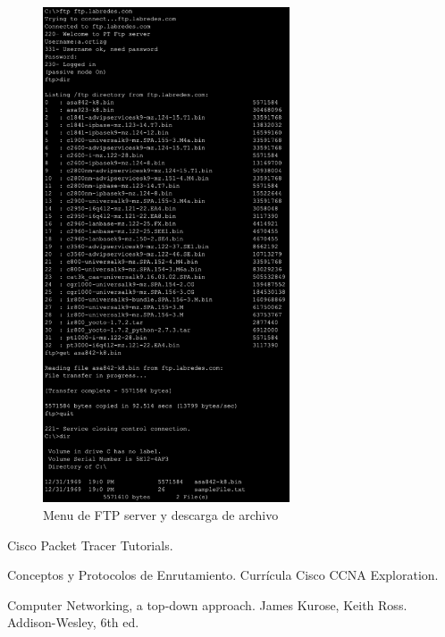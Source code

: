 \documentclass[10pt]{article}
\begin{document}
\begin{figure}[H]
    \centering
    \includegraphics[width=0.65\textwidth]{lab-01-screenshots/46-3-get-ftp}
    \caption{Menu de FTP server y descarga de archivo}
\end{figure}

\begin{thebibliography}{9}

  Cisco Packet Tracer Tutorials.

  Conceptos y Protocolos de Enrutamiento. Currícula Cisco CCNA Exploration.

  Computer Networking, a top-down approach. James Kurose, Keith Ross. Addison-Wesley, 6th ed.

  \end{thebibliography}
\end{document}
